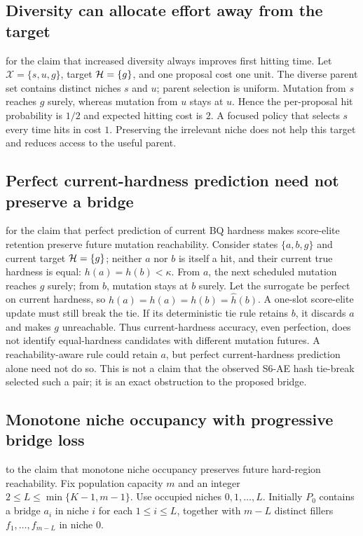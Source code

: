 \subsection{Diversity can allocate effort away from the target}
 for the claim that increased diversity always improves
first hitting time. Let $\mathcal{X}=\{s,u,g\}$, target $\mathcal{H}=\{g\}$,
and one proposal cost one unit. The diverse parent set contains distinct
niches $s$ and $u$; parent selection is uniform. Mutation from $s$ reaches
$g$ surely, whereas mutation from $u$ stays at $u$. Hence the per-proposal
hit probability is $1/2$ and expected hitting cost is $2$. A focused policy
that selects $s$ every time hits in cost $1$. Preserving the irrelevant
niche does not help this target and reduces access to the useful parent.

\subsection{Perfect current-hardness prediction need not preserve a bridge}
 for the claim that perfect prediction of current BQ
hardness makes score-elite retention preserve future mutation reachability.
Consider states $\{a,b,g\}$ and current target $\mathcal{H}=\{g\}$; neither $a$
nor $b$ is itself a hit, and their current true hardness is equal:
$h(a)=h(b)<\kappa$. From $a$, the next scheduled mutation reaches $g$
surely; from $b$, mutation stays at $b$ surely. Let the surrogate be perfect
on current hardness, so $\widehat h(a)=h(a)=h(b)=\widehat h(b)$. A one-slot
score-elite update must still break the tie. If its deterministic tie rule
retains $b$, it discards $a$ and makes $g$ unreachable. Thus current-hardness
accuracy, even perfection, does not identify equal-hardness candidates with
different mutation futures. A reachability-aware rule could retain $a$, but
perfect current-hardness prediction alone need not do so. This is not a claim
that the observed S6-AE hash tie-break selected such a pair; it is an exact
obstruction to the proposed bridge.

\subsection{Monotone niche occupancy with progressive bridge loss}
\label{sec:progressive-bridge-loss}
 to the claim that monotone niche occupancy
preserves future hard-region reachability. Fix population capacity $m$ and an
integer $2\leq L\leq\min\{K-1,m-1\}$. Use occupied niches
$0,1,\ldots,L$. Initially $P_0$ contains a bridge $a_i$ in niche $i$ for
each $1\leq i\leq L$, together with $m-L$ distinct fillers
$f_1,\ldots,f_{m-L}$ in niche $0$.

